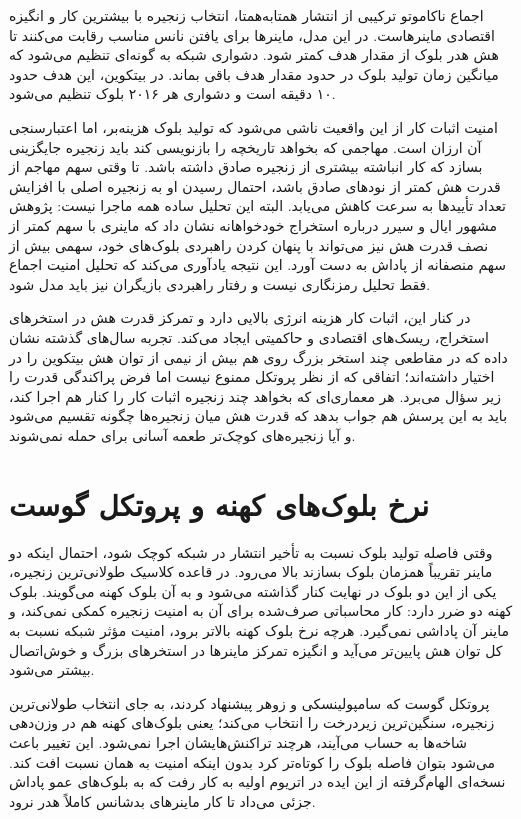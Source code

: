 اجماع ناکاموتو ترکیبی از انتشار همتا‌به‌همتا، انتخاب زنجیره با بیشترین کار و انگیزه اقتصادی ماینرهاست. در این مدل، ماینرها برای یافتن نانس مناسب رقابت می‌کنند تا هش هدر بلوک از مقدار هدف کمتر شود. دشواری شبکه به گونه‌ای تنظیم می‌شود که میانگین زمان تولید بلوک در حدود مقدار هدف باقی بماند. در بیتکوین، این هدف حدود ۱۰ دقیقه است و دشواری هر ۲۰۱۶ بلوک تنظیم می‌شود.

امنیت اثبات کار از این واقعیت ناشی می‌شود که تولید بلوک هزینه‌بر، اما اعتبارسنجی آن ارزان است. مهاجمی که بخواهد تاریخچه را بازنویسی کند باید زنجیره جایگزینی بسازد که کار انباشته بیشتری از زنجیره صادق داشته باشد. تا وقتی سهم مهاجم از قدرت هش کمتر از نودهای صادق باشد، احتمال رسیدن او به زنجیره اصلی با افزایش تعداد تأییدها به سرعت کاهش می‌یابد. البته این تحلیل ساده همه ماجرا نیست: پژوهش مشهور ایال و سیرر درباره استخراج خودخواهانه نشان داد که ماینری با سهم کمتر از نصف قدرت هش نیز می‌تواند با پنهان کردن راهبردی بلوک‌های خود، سهمی بیش از سهم منصفانه از پاداش به دست آورد. این نتیجه یادآوری می‌کند که تحلیل امنیت اجماع فقط تحلیل رمزنگاری نیست و رفتار راهبردی بازیگران نیز باید مدل شود.

در کنار این، اثبات کار هزینه انرژی بالایی دارد و تمرکز قدرت هش در استخرهای استخراج، ریسک‌های اقتصادی و حاکمیتی ایجاد می‌کند. تجربه سال‌های گذشته نشان داده که در مقاطعی چند استخر بزرگ روی هم بیش از نیمی از توان هش بیتکوین را در اختیار داشته‌اند؛ اتفاقی که از نظر پروتکل ممنوع نیست اما فرض پراکندگی قدرت را زیر سؤال می‌برد. هر معماری‌ای که بخواهد چند زنجیره اثبات کار را کنار هم اجرا کند، باید به این پرسش هم جواب بدهد که قدرت هش میان زنجیره‌ها چگونه تقسیم می‌شود و آیا زنجیره‌های کوچک‌تر طعمه آسانی برای حمله نمی‌شوند.

\section{نرخ بلوک‌های کهنه و پروتکل گوست}

وقتی فاصله تولید بلوک نسبت به تأخیر انتشار در شبکه کوچک شود، احتمال اینکه دو ماینر تقریباً همزمان بلوک بسازند بالا می‌رود. در قاعده کلاسیک طولانی‌ترین زنجیره، یکی از این دو بلوک در نهایت کنار گذاشته می‌شود و به آن بلوک کهنه می‌گویند. بلوک کهنه دو ضرر دارد: کار محاسباتی صرف‌شده برای آن به امنیت زنجیره کمکی نمی‌کند، و ماینر آن پاداشی نمی‌گیرد. هرچه نرخ بلوک کهنه بالاتر برود، امنیت مؤثر شبکه نسبت به کل توان هش پایین‌تر می‌آید و انگیزه تمرکز ماینرها در استخرهای بزرگ و خوش‌اتصال بیشتر می‌شود.

پروتکل گوست که سامپولینسکی و زوهر پیشنهاد کردند، به جای انتخاب طولانی‌ترین زنجیره، سنگین‌ترین زیردرخت را انتخاب می‌کند؛ یعنی بلوک‌های کهنه هم در وزن‌دهی شاخه‌ها به حساب می‌آیند، هرچند تراکنش‌هایشان اجرا نمی‌شود. این تغییر باعث می‌شود بتوان فاصله بلوک را کوتاه‌تر کرد بدون اینکه امنیت به همان نسبت افت کند. نسخه‌ای الهام‌گرفته از این ایده در اتریوم اولیه به کار رفت که به بلوک‌های عمو پاداش جزئی می‌داد تا کار ماینرهای بدشانس کاملاً هدر نرود.

